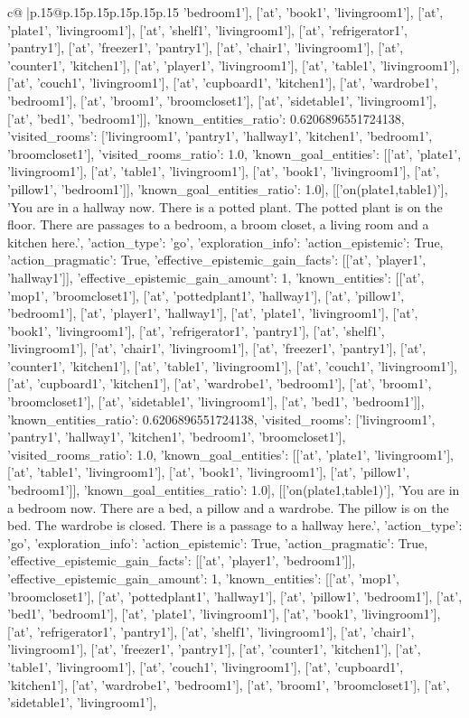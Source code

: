 \documentclass{article}
\begin{document}
{\begin{supertabular}{c@{$\;$}|p{.15\linewidth}@{}p{.15\linewidth}p{.15\linewidth}p{.15\linewidth}p{.15\linewidth}p{.15\linewidth}}
{{{'bedroom1'], ['at', 'book1', 'livingroom1'], ['at', 'plate1', 'livingroom1'], ['at', 'shelf1', 'livingroom1'], ['at', 'refrigerator1', 'pantry1'], ['at', 'freezer1', 'pantry1'], ['at', 'chair1', 'livingroom1'], ['at', 'counter1', 'kitchen1'], ['at', 'player1', 'livingroom1'], ['at', 'table1', 'livingroom1'], ['at', 'couch1', 'livingroom1'], ['at', 'cupboard1', 'kitchen1'], ['at', 'wardrobe1', 'bedroom1'], ['at', 'broom1', 'broomcloset1'], ['at', 'sidetable1', 'livingroom1'], ['at', 'bed1', 'bedroom1']], 'known_entities_ratio': 0.6206896551724138, 'visited_rooms': ['livingroom1', 'pantry1', 'hallway1', 'kitchen1', 'bedroom1', 'broomcloset1'], 'visited_rooms_ratio': 1.0, 'known_goal_entities': [['at', 'plate1', 'livingroom1'], ['at', 'table1', 'livingroom1'], ['at', 'book1', 'livingroom1'], ['at', 'pillow1', 'bedroom1']], 'known_goal_entities_ratio': 1.0}}], [['on(plate1,table1)'], 'You are in a hallway now. There is a potted plant. The potted plant is on the floor. There are passages to a bedroom, a broom closet, a living room and a kitchen here.', {'action_type': 'go', 'exploration_info': {'action_epistemic': True, 'action_pragmatic': True, 'effective_epistemic_gain_facts': [['at', 'player1', 'hallway1']], 'effective_epistemic_gain_amount': 1, 'known_entities': [['at', 'mop1', 'broomcloset1'], ['at', 'pottedplant1', 'hallway1'], ['at', 'pillow1', 'bedroom1'], ['at', 'player1', 'hallway1'], ['at', 'plate1', 'livingroom1'], ['at', 'book1', 'livingroom1'], ['at', 'refrigerator1', 'pantry1'], ['at', 'shelf1', 'livingroom1'], ['at', 'chair1', 'livingroom1'], ['at', 'freezer1', 'pantry1'], ['at', 'counter1', 'kitchen1'], ['at', 'table1', 'livingroom1'], ['at', 'couch1', 'livingroom1'], ['at', 'cupboard1', 'kitchen1'], ['at', 'wardrobe1', 'bedroom1'], ['at', 'broom1', 'broomcloset1'], ['at', 'sidetable1', 'livingroom1'], ['at', 'bed1', 'bedroom1']], 'known_entities_ratio': 0.6206896551724138, 'visited_rooms': ['livingroom1', 'pantry1', 'hallway1', 'kitchen1', 'bedroom1', 'broomcloset1'], 'visited_rooms_ratio': 1.0, 'known_goal_entities': [['at', 'plate1', 'livingroom1'], ['at', 'table1', 'livingroom1'], ['at', 'book1', 'livingroom1'], ['at', 'pillow1', 'bedroom1']], 'known_goal_entities_ratio': 1.0}}], [['on(plate1,table1)'], 'You are in a bedroom now. There are a bed, a pillow and a wardrobe. The pillow is on the bed. The wardrobe is closed. There is a passage to a hallway here.', {'action_type': 'go', 'exploration_info': {'action_epistemic': True, 'action_pragmatic': True, 'effective_epistemic_gain_facts': [['at', 'player1', 'bedroom1']], 'effective_epistemic_gain_amount': 1, 'known_entities': [['at', 'mop1', 'broomcloset1'], ['at', 'pottedplant1', 'hallway1'], ['at', 'pillow1', 'bedroom1'], ['at', 'bed1', 'bedroom1'], ['at', 'plate1', 'livingroom1'], ['at', 'book1', 'livingroom1'], ['at', 'refrigerator1', 'pantry1'], ['at', 'shelf1', 'livingroom1'], ['at', 'chair1', 'livingroom1'], ['at', 'freezer1', 'pantry1'], ['at', 'counter1', 'kitchen1'], ['at', 'table1', 'livingroom1'], ['at', 'couch1', 'livingroom1'], ['at', 'cupboard1', 'kitchen1'], ['at', 'wardrobe1', 'bedroom1'], ['at', 'broom1', 'broomcloset1'], ['at', 'sidetable1', 'livingroom1'], }}}
\end{supertabular}}
\end{document}
